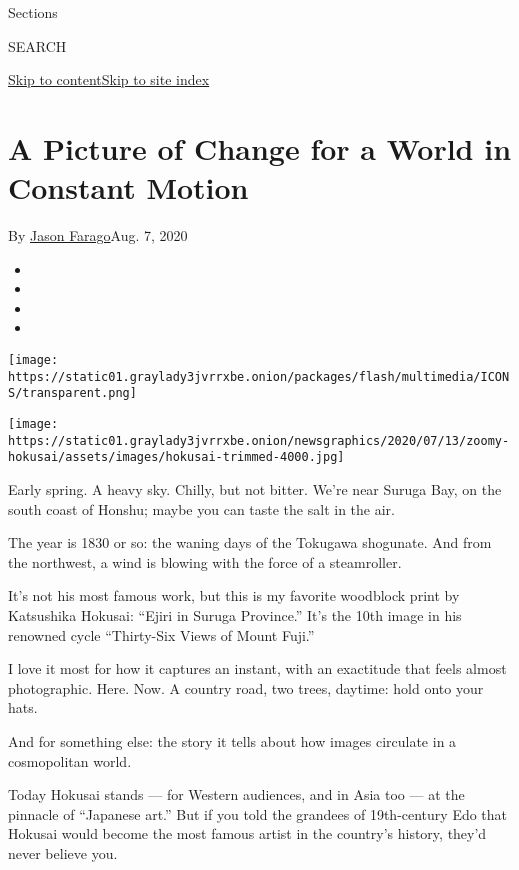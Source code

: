 Sections

SEARCH

\protect\hyperlink{site-content}{Skip to
content}\protect\hyperlink{site-index}{Skip to site index}

\hypertarget{a-picture-of-change-for-a-world-in-constant-motion}{%
\section{A Picture of Change for a World in Constant
Motion}\label{a-picture-of-change-for-a-world-in-constant-motion}}

By \href{https://www.nytimes3xbfgragh.onion/by/jason-farago}{Jason
Farago}Aug. 7, 2020

\begin{itemize}
\item
\item
\item
\item
\end{itemize}

\texttt{[image: https://static01.graylady3jvrrxbe.onion/packages/flash/multimedia/ICONS/transparent.png]}

\texttt{[image: https://static01.graylady3jvrrxbe.onion/newsgraphics/2020/07/13/zoomy-hokusai/assets/images/hokusai-trimmed-4000.jpg]}

Early spring. A heavy sky. Chilly, but not bitter. We're near Suruga
Bay, on the south coast of Honshu; maybe you can taste the salt in the
air.

The year is 1830 or so: the waning days of the Tokugawa shogunate. And
from the northwest, a wind is blowing with the force of a steamroller.

It's not his most famous work, but this is my favorite woodblock print
by Katsushika Hokusai: ``Ejiri in Suruga Province.'' It's the 10th image
in his renowned cycle ``Thirty-Six Views of Mount Fuji.''

I love it most for how it captures an instant, with an exactitude that
feels almost photographic. Here. Now. A country road, two trees,
daytime: hold onto your hats.

And for something else: the story it tells about how images circulate in
a cosmopolitan world.

Today Hokusai stands --- for Western audiences, and in Asia too --- at
the pinnacle of ``Japanese art.'' But if you told the grandees of
19th-century Edo that Hokusai would become the most famous artist in the
country's history, they'd never believe you.

